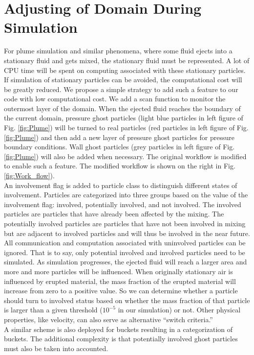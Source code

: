 \documentclass[procedia]{easychair}
\begin{document}
\section{Adjusting of Domain During Simulation} 
For plume simulation and similar phenomena, where some fluid ejects into a stationary fluid and gets mixed, the stationary fluid must be represented.
A lot of CPU time will be spent on computing associated with these stationary particles. If simulation of stationary particles can be avoided, the computational cost will be greatly reduced.
We propose a simple strategy to add such a feature to our code with low computational cost. We add a scan function to monitor the outermost layer of the domain. When the ejected fluid reaches the boundary of the current domain, pressure ghost particles (light blue particles in left figure of Fig. \ref{fig:Plume}) will be turned to real particles (red particles in left figure of Fig. \ref{fig:Plume}) and then add a new layer of pressure ghost particles for pressure boundary conditions. Wall ghost particles (grey particles in left figure of Fig. \ref{fig:Plume}) will also be added when necessary. The original workflow is modified to enable such a feature. The modified workflow is shown on the right in Fig. \ref{fig:Work_flow}).\\
An involvement flag is added to particle class to distinguish different states of involvement. Particles are categorized into three groups based on the value of the involvement flag: involved, potentially involved, and not involved. The involved particles are particles that have already been affected by the mixing. The potentially involved particles are particles that have not been involved in mixing but are adjacent to involved particles and will thus be involved in the near future. 
All communication and computation associated with uninvolved particles can be ignored. That is to say, only potential involved and involved particles need to be simulated.
As simulation progresses, the ejected fluid will reach a larger area and more and more particles will be influenced. When originally stationary air is influenced by erupted material, the mass fraction of the erupted material will increase from zero to a positive value. So we can determine whether a particle should turn to involved status based on whether the mass fraction of that particle is larger than a given threshold ($10^{-5} $ in our simulation) or not. Other physical properties, like velocity, can also serve as alternative ``switch criteria.''\\
A similar scheme is also deployed for buckets resulting in a categorization of buckets. The additional complexity is that potentially involved ghost particles must also be taken into accounted.
\end{document}
